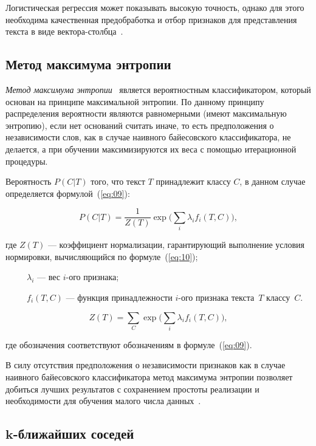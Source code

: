 Логистическая регрессия может показывать высокую точность, однако для этого
необходима качественная предобработка и отбор признаков для представления текста
в виде вектора-столбца~\cite{article05}.

\subsection{Метод максимума энтропии}

\textit{Метод максимума энтропии}~\cite{article19} является вероятностным
классификатором, который основан на принципе максимальной энтропии. По данному
принципу распределения вероятности являются равномерными (имеют максимальную
энтропию), если нет оснований считать иначе, то есть предположения о
независимости слов, как в случае наивного байесовского классификатора, не
делается, а при обучении максимизируются их веса с помощью итерационной
процедуры.

Вероятность $P(C|T)$ того, что текст $T$ принадлежит классу $C$, в данном случае
определяется формулой~(\ref{eq:09}):

\begin{equation}\label{eq:09}
    P(C|T) = \frac{1}{Z(T)}\exp\Big(\sum_i \lambda_i f_i(T, C)\Big),
\end{equation}

где $Z(T)$ --- коэффициент нормализации, гарантирующий выполнение условия
нормировки, вычисляющийся по формуле~(\ref{eq:10});

~~~~~$\lambda_i$ --- вес $i$-ого признака;

~~~~~$f_i(T, C)$ --- функция принадлежности $i$-ого признака текста~$T$
классу~$C$.

\begin{equation}\label{eq:10}
    Z(T) = \sum_C\exp\Big(\sum_i \lambda_i f_i(T, C)\Big),
\end{equation}

где обозначения соответствуют обозначениям в формуле~(\ref{eq:09}).

В силу отсутствия предположения о независимости признаков как в
случае наивного байесовского классификатора метод максимума энтропии
позволяет добиться лучших результатов с сохранением простоты реализации и
необходимости для обучения малого числа данных~\cite{article05}.

\subsection[$k$-ближайших соседей]{$\pmb{k}$-ближайших соседей}

